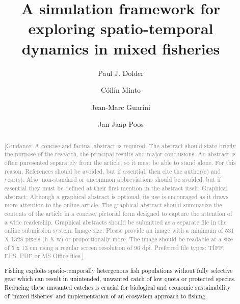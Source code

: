\documentclass[review]{elsarticle}
\begin{document}
\begin{frontmatter}

\title{A simulation framework for exploring spatio-temporal dynamics in mixed
	fisheries}

\author[1,2]{Paul J. Dolder}

\author[1]{Cóilín Minto}
\author[3]{Jean-Marc Guarini}
\author[4]{Jan-Jaap Poos}

\address[1]{Galway-Mayo Institute of Technology (GMIT), Dublin Road, Galway,
	Ireland} 
\address[2]{Centre for Environment, Fisheries and Aquaculture Science (Cefas),
	Pakefield Road, Lowestoft, UK}
\address[3]{Université Pierre et Marie Curie, 4 Place Jussieu, 75005 Paris,
	France}
\address[4]{Wageningen Marine Research, Haringkade 1 1976 CP IJmuiden,
	Netherlands}

\begin{abstract}
\textcolor{gray}{[Guidance: A concise and factual abstract is required. The abstract 
should state briefly the purpose of the research, the principal results and
major conclusions. An abstract is often pnresented separately from the article,
so it must be able to stand alone. For this reason, References should be
avoided, but if essential, then cite the author(s) and year(s). Also,
non-standard or uncommon abbreviations should be avoided, but if essential they
must be defined at their first mention in the abstract itself.  Graphical
abstract: Although a graphical abstract is optional, its use is encouraged as
it draws more attention to the online article. The graphical abstract should
summarize the contents of the article in a concise, pictorial form designed to
capture the attention of a wide readership. Graphical abstracts should be
submitted as a separate file in the online submission system. Image size:
Please provide an image with a minimum of 531 X 1328 pixels (h X w) or
proportionally more. The image should be readable at a size of 5 x 13 cm using
a regular screen resolution of 96 dpi.  Preferred file types: TIFF, EPS, PDF or
MS Office files.] \\}

Fishing exploits spatio-temporally hetergenous fish populations without fully
selective gear which can result in unintended, unwanted catch of low quota or
protected species. Reducing these unwanted catches is crucial for biological
and economic sustainability of 'mixed fisheries' and implementation of an
ecosystem approach to fishing. \\


\end{abstract}
\end{frontmatter}
\end{document}
